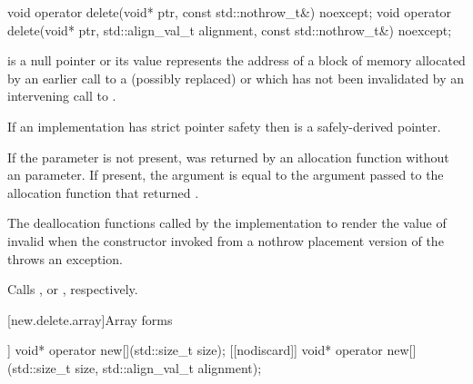 %
\begin{itemdecl}
void operator delete(void* ptr, const std::nothrow_t&) noexcept;
void operator delete(void* ptr, std::align_val_t alignment, const std::nothrow_t&) noexcept;
\end{itemdecl}

\begin{itemdescr}
\pnum
\expects
{} is a null pointer or
its value represents the address of
a block of memory allocated by
an earlier call to a (possibly replaced)
or
which has not been invalidated by an intervening call to
.

\pnum
If an implementation has strict pointer safety
then  is a safely-derived pointer.

\pnum
If the  parameter is not present,
 was returned by an allocation function
without an  parameter.
If present, the  argument
is equal to the  argument
passed to the allocation function that returned .

\pnum
\effects
The
deallocation functions
called by the implementation
to render the value of  invalid
when the constructor invoked from a nothrow
placement version of the  throws an exception.

\pnum
\replaceable
{}

\pnum
{}
Calls ,
or ,
respectively.
\end{itemdescr}

[new.delete.array]{Array forms}

%
\begin{itemdecl}
[[nodiscard]] void* operator new[](std::size_t size);
[[nodiscard]] void* operator new[](std::size_t size, std::align_val_t alignment);
\end{itemdecl}

